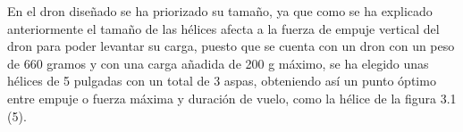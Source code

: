  
 En el dron diseñado se ha priorizado su tamaño, ya que como se ha explicado anteriormente el tamaño de las hélices afecta a la fuerza de empuje vertical del dron para poder levantar su carga, puesto que  se cuenta con un dron con un peso de 660 gramos y con una carga añadida de 200 g máximo, se ha elegido unas hélices de 5 pulgadas con un total de 3 aspas, obteniendo así un punto óptimo entre empuje o fuerza máxima y duración de vuelo, como la hélice de la figura 3.1 (5).

